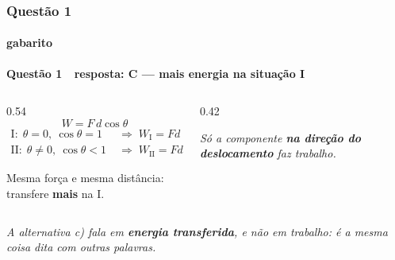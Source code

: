\documentclass[aspectratio=169,12pt]{beamer}
\newcommand{\resposta}[2]{%
  \par\vspace{0.2em}
  {\Large\bfseries\color{vinho}Quest\~ao #1 \,\textemdash\, resposta: #2}
  \par\vspace{0.6em}}
\begin{document}
\begin{frame}
\frametitle{Quest\~ao 1}
\framesubtitle{gabarito}
\resposta{1}{C --- mais energia na situa\c{c}\~ao I}

\begin{columns}[T]
\begin{column}{0.54\textwidth}
\[ W = F\,d\cos\theta \]
\vspace{-1.2em}
\begin{align*}
  \text{I:}\ \ \theta = 0,\ \cos\theta = 1
    &\;\Rightarrow\; W_{\mathrm{I}} = F d\\[0.3em]
  \text{II:}\ \ \theta \neq 0,\ \cos\theta < 1
    &\;\Rightarrow\; W_{\mathrm{II}} = F d\cos\theta
\end{align*}

Mesma for\c{c}a e mesma dist\^ancia: transfere \textbf{mais} na I.
\end{column}
\begin{column}{0.42\textwidth}
\centering
{}

\vspace{0.2em}
{\color{grafite}\itshape\small S\'o a componente \textbf{na
dire\c{c}\~ao do deslocamento} faz trabalho.}
\end{column}
\end{columns}

{\color{grafite}\itshape\small A alternativa c) fala em \textbf{energia
transferida}, e n\~ao em trabalho: \'e a mesma coisa dita com outras
palavras.}
\end{frame}
\end{document}
